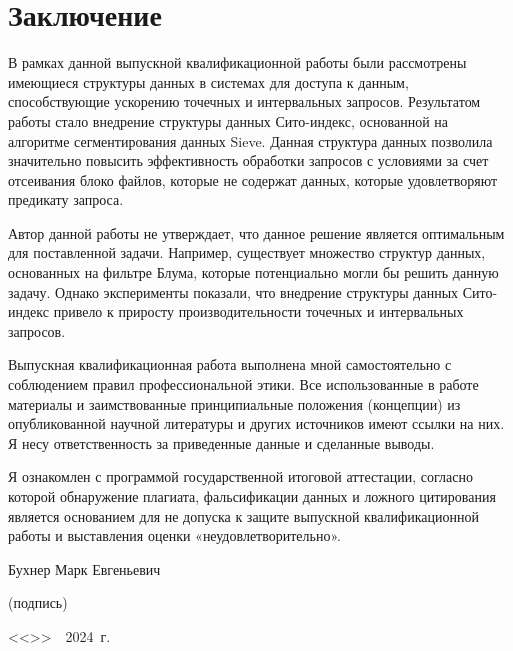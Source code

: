 \section*{Заключение}

В рамках данной выпускной квалификационной работы были рассмотрены имеющиеся структуры данных в системах для доступа к данным, способствующие ускорению точечных и интервальных запросов. Результатом работы стало внедрение структуры данных Сито-индекс, основанной на алгоритме сегментирования данных Sieve. Данная структура данных позволила значительно повысить эффективность обработки запросов с условиями за счет отсеивания блоко файлов, которые не содержат данных, которые удовлетворяют предикату запроса.

Автор данной работы не утверждает, что данное решение является оптимальным для поставленной задачи. Например, существует множество структур данных, основанных на фильтре Блума, которые потенциально могли бы решить данную задачу. Однако эксперименты показали, что внедрение структуры данных Сито-индекс привело к приросту производительности точечных и интервальных запросов.

Выпускная квалификационная работа выполнена мной самостоятельно с соблюдением правил профессиональной этики. Все использованные в работе материалы и заимствованные принципиальные положения (концепции) из опубликованной научной литературы и других источников имеют ссылки на них. Я несу ответственность за приведенные данные и сделанные выводы.

Я ознакомлен с программой государственной итоговой аттестации, согласно которой обнаружение плагиата, фальсификации данных и ложного цитирования является основанием для не допуска к защите выпускной квалификационной работы и выставления оценки «неудовлетворительно».

\vspace{3em}
\noindent
Бухнер Марк Евгеньевич \hspace*{\fill} \makebox[5cm]{\hrulefill}\\
\vspace{-3em}
\begin{flushright}
			\footnotesize (подпись)~~~~~~~~~~~~~~~
\end{flushright}

\noindent
<<\makebox[0.7cm]{\hrulefill}>>~\makebox[3cm]{\hrulefill}~2024~г. 

